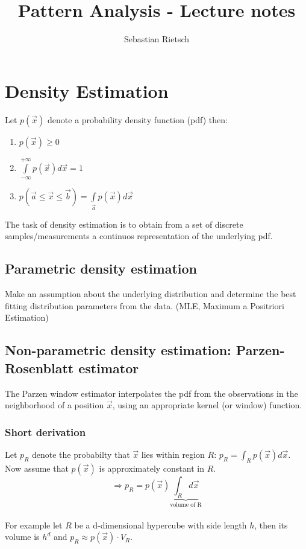 \documentclass{scrartcl}
\title{Pattern Analysis - Lecture notes}
\author{Sebastian Rietsch}
\begin{document}
\maketitle
\tableofcontents
\section{Density Estimation}
Let \(p(\vec{x})\) denote a probability density function (pdf) then:
\begin{enumerate}
    \item
        \(p(\vec{x}) \geq 0 \)
    \item
        \(\int\limits_{-\infty}^{+\infty} p(\vec{x}) d\vec{x} = 1 \)
    \item
        \(p(\vec{a} \leq \vec{x} \leq \vec{b}) = \int\limits_{\vec{a}} p(\vec{x}) d\vec{x} \)
\end{enumerate}
The task of density estimation is to obtain from a set of discrete samples/measurements a continuos representation of the underlying pdf.

\subsection{Parametric density estimation}
Make an assumption about the underlying distribution and determine the best fitting distribution parameters from the data. (MLE, Maximum a Positriori Estimation)

\subsection{Non-parametric density estimation: Parzen-Rosenblatt estimator}
The Parzen window estimator interpolates the pdf from the observations in the neighborhood of a position \(\vec{x}\), using an appropriate kernel (or window) function.

\subsubsection*{Short derivation}
Let \(p_R\) denote the probabilty that \(\vec{x}\) lies within region \(R\): \(p_R = \int_R p(\vec{x}) d\vec{x}\).\\
Now assume that \(p(\vec{x})\) is approximately constant in \(R\).
 \[\Rightarrow p_R = p(\vec{x}) \underbrace{\int_R d\vec{x}}_\text{volume of R}\]\\
For example let \(R\) be a d-dimensional hypercube with side length \(h\), then its volume is \(h^d\) and \(p_R \approx p(\vec{x}) \cdot V_R\).
\end{document}
